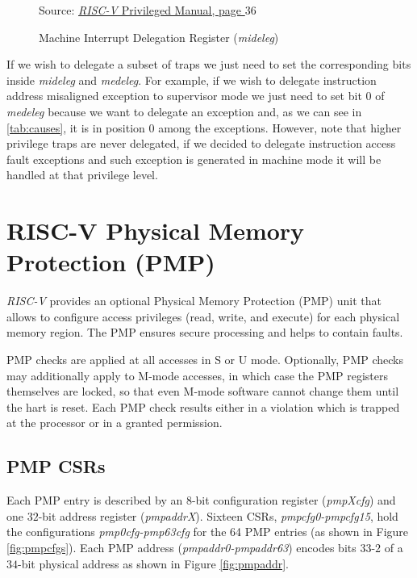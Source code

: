 \begin{figure}[htbp]
  \centering
  \def\stackalignment{r} %
  {\scriptsize Source: \href{https://drive.google.com/file/d/17GeetSnT5wW3xNuAHI95-SI1gPGd5sJ_/view}{\textit{RISC-V} Privileged Manual, page $36$}}
  \caption{Machine Interrupt Delegation Register (\textit{mideleg})}
  \label{fig:mideleg}
\end{figure}

If we wish to delegate a subset of traps we just need to set the corresponding
bits inside \textit{mideleg} and \textit{medeleg}. For example, if we wish to
delegate instruction address misaligned exception to supervisor mode we just
need to set bit $0$ of \textit{medeleg} because we want to delegate an exception
and, as we can see in \ref{tab:causes}, it is in position $0$ among the exceptions.
However, note that higher privilege traps are never delegated, if we decided to
delegate instruction access fault exceptions and such exception is generated in
machine mode it will be handled at that privilege level.

\section{RISC-V Physical Memory Protection (PMP)}
\label{sec:riscv_pmp}

\textit{RISC-V} provides an optional Physical Memory Protection (PMP) unit that
allows to configure access privileges (read, write, and execute) for each
physical memory region. The PMP ensures secure processing and helps to contain faults.

PMP checks are applied at all accesses in S or U mode. Optionally, PMP checks may
additionally apply to M-mode accesses, in which case the PMP registers
themselves are locked, so that even M-mode software cannot change them until the
hart is reset. Each PMP check results either in a violation which is trapped at
the processor or in a granted permission.

\subsection{PMP CSRs}
\label{subsec:riscv_pmpcsr}

Each PMP entry is described by an 8-bit configuration register (\textit{pmpXcfg})
and one $32$-bit address register (\textit{pmpaddrX}). Sixteen CSRs, \textit{pmpcfg0-pmpcfg15},
hold the configurations \textit{pmp0cfg-pmp63cfg} for the 64 PMP entries (as shown
in Figure \ref{fig:pmpcfgs}). Each PMP address (\textit{pmpaddr0-pmpaddr63})
encodes bits $33$-$2$ of a $34$-bit physical address as shown in Figure
\ref{fig:pmpaddr}.

